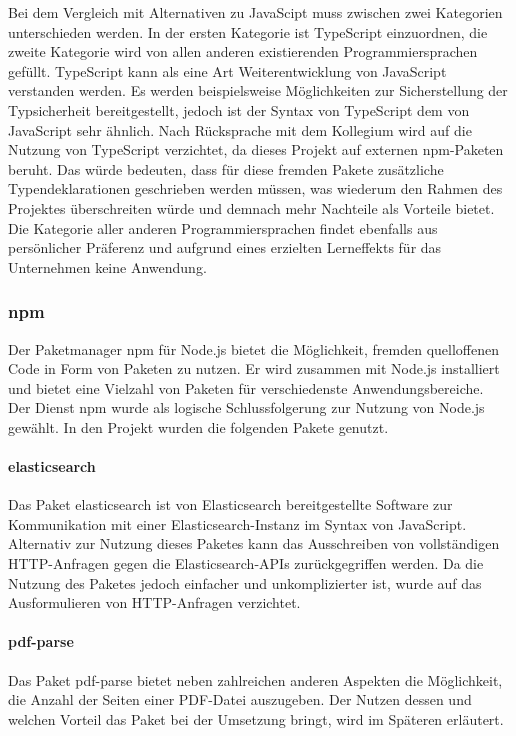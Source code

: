 \documentclass[a4paper]{scrartcl}
\begin{document}
Bei dem Vergleich mit Alternativen zu JavaScipt muss zwischen zwei Kategorien unterschieden werden. In der ersten Kategorie ist TypeScript einzuordnen, die zweite Kategorie wird von allen anderen existierenden Programmiersprachen gefüllt. TypeScript kann als eine Art Weiterentwicklung von JavaScript verstanden werden. Es werden beispielsweise Möglichkeiten zur Sicherstellung der Typsicherheit bereitgestellt, jedoch ist der Syntax von TypeScript dem von JavaScript sehr ähnlich. Nach Rücksprache mit dem Kollegium wird auf die Nutzung von TypeScript verzichtet, da dieses Projekt auf externen npm-Paketen beruht. Das würde bedeuten, dass für diese fremden Pakete zusätzliche Typendeklarationen geschrieben werden müssen, was wiederum den Rahmen des Projektes überschreiten würde und demnach mehr Nachteile als Vorteile bietet. \\
Die Kategorie aller anderen Programmiersprachen findet ebenfalls aus persönlicher Präferenz und aufgrund eines erzielten Lerneffekts für das Unternehmen keine Anwendung.

\subsubsection{npm}
Der Paketmanager npm für Node.js bietet die Möglichkeit, fremden quelloffenen Code in Form von Paketen zu nutzen. Er wird zusammen mit Node.js installiert und bietet eine Vielzahl von Paketen für verschiedenste Anwendungsbereiche.\\
Der Dienst npm wurde als logische Schlussfolgerung zur Nutzung von Node.js gewählt. In den Projekt wurden die folgenden Pakete genutzt.

\paragraph{elasticsearch}
Das Paket elasticsearch ist von Elasticsearch bereitgestellte Software zur Kommunikation mit einer Elasticsearch-Instanz im Syntax von JavaScript. \\
Alternativ zur Nutzung dieses Paketes kann das Ausschreiben von vollständigen HTTP-Anfragen gegen die Elasticsearch-APIs zurückgegriffen werden. Da die Nutzung des Paketes jedoch einfacher und unkomplizierter ist, wurde auf das Ausformulieren von HTTP-Anfragen verzichtet.

\paragraph{pdf-parse}
Das Paket pdf-parse bietet neben zahlreichen anderen Aspekten die Möglichkeit, die Anzahl der Seiten einer PDF-Datei auszugeben. Der Nutzen dessen und welchen Vorteil das Paket bei der Umsetzung bringt, wird im Späteren erläutert.
\end{document}

